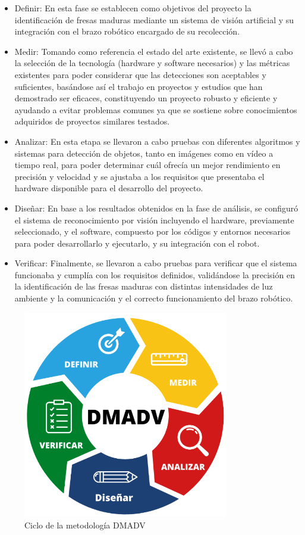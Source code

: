 \begin{itemize}
  \item Definir: En esta fase se establecen como objetivos del proyecto la identificación de fresas maduras mediante un sistema de visión artificial y su integración con el brazo robótico encargado de su recolección. 
  \item Medir: Tomando como referencia el estado del arte existente, se llevó a cabo la selección de la tecnología (hardware y software necesarios) y las métricas existentes para poder considerar que las detecciones son aceptables y suficientes, basándose así el trabajo en proyectos y estudios que han demostrado ser eficaces, constituyendo un proyecto robusto y eficiente y ayudando a evitar problemas comunes ya que se sostiene sobre conocimientos adquiridos de proyectos similares testados. 
  \item Analizar: En esta etapa se llevaron a cabo pruebas con diferentes algoritmos y sistemas para detección de objetos, tanto en imágenes como en vídeo a tiempo real, para poder determinar cuál ofrecía un mejor rendimiento en precisión y velocidad y se ajustaba a los requisitos que presentaba el hardware disponible para el desarrollo del proyecto.  
  \item Diseñar: En base a los resultados obtenidos en la fase de análisis, se configuró el sistema de reconocimiento por visión incluyendo el hardware, previamente seleccionado, y el software, compuesto por los códigos y entornos necesarios para poder desarrollarlo y ejecutarlo, y su integración con el robot.
  \item Verificar: Finalmente, se llevaron a cabo pruebas para verificar que el sistema funcionaba y cumplía con los requisitos definidos, validándose la precisión en la identificación de las fresas maduras con distintas intensidades de luz ambiente y la comunicación y el correcto funcionamiento del brazo robótico.
\end{itemize}
  
\begin{figure} [H]
    \begin{center}
      \includegraphics[width=9cm]{figs/DMADV.png}
    \end{center}
    \caption{Ciclo de la metodología DMADV}
    \label{fig:DMADV}
\end{figure}


